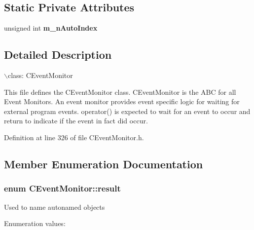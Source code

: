 \subsection*{Static Private Attributes}
\begin{CompactItemize}
\item 
unsigned int {\bf m\_\-n\-Auto\-Index}
\end{CompactItemize}


\subsection{Detailed Description}
$\backslash$class: CEvent\-Monitor

This file defines the CEvent\-Monitor class. CEvent\-Monitor is the ABC for all Event Monitors. An event monitor  provides event specific logic for waiting for external program events. operator() is expected to wait for an event to occur and return to  indicate if the event in fact did occur. 



Definition at line 326 of file CEvent\-Monitor.h.

\subsection{Member Enumeration Documentation}
\subsubsection{\setlength{\rightskip}{0pt plus 5cm}enum CEvent\-Monitor::result}\label{classCEventMonitor_s3}


Used to name autonamed objects \begin{Desc}
\item[Enumeration values:]\par
\begin{description}
\item[{\em 
{\em Occurred}\label{classCEventMonitor_s3s0}
}]\item[{\em 
{\em Timed\-Out}\label{classCEventMonitor_s3s1}
}]\item[{\em 
{\em Error}\label{classCEventMonitor_s3s2}
}]\end{description}
\end{Desc}



